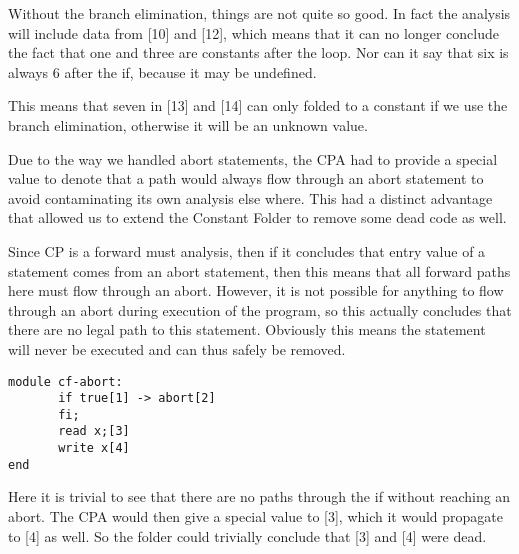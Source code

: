   Without the  branch elimination, things are not quite so good. In fact the
analysis will include data from [10] and [12], which means that it can no
longer conclude the fact that one and three are constants after the loop.
Nor can it say that six is always 6 after the if, because it may be undefined.

  This means that seven in [13] and [14] can only folded to a constant if we
use the branch elimination, otherwise it will be an unknown value.

\docpar
Due to the way we handled abort statements, the CPA had to provide a special
value to denote that a path would always flow through an abort statement to
avoid contaminating its own analysis else where. This had a distinct
advantage that allowed us to extend the Constant Folder to remove some dead
code as well.

  Since CP is a forward must analysis, then if it concludes that entry value of
a statement comes from an abort statement, then this means that all forward paths
here must flow through an abort. However, it is not possible for anything to flow
through an abort during execution of the program, so this actually concludes that
there are no legal path to this statement. Obviously this means the statement
will never be executed and can thus safely be removed.

\begin{lstlisting}
module cf-abort:
       if true[1] -> abort[2]
       fi;
       read x;[3]
       write x[4]
end
\end{lstlisting}

\docpar
Here it is trivial to see that there are no paths through the if without
reaching an abort. The CPA would then give a special value to [3], which
it would propagate to [4] as well. So the folder could trivially conclude
that [3] and [4] were dead.

